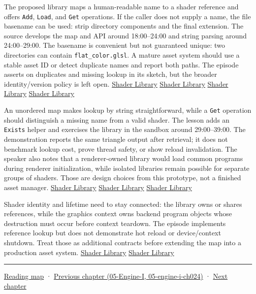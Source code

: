 The proposed library maps a human-readable name to a shader reference and offers \texttt{Add}, \texttt{Load}, and \texttt{Get} operations. If the caller does not supply a name, the file basename can be used: strip directory components and the final extension. The source develops the map and API around 18:00--24:00 and string parsing around 24:00--29:00. The basename is convenient but not guaranteed unique: two directories can contain \texttt{flat\_color.glsl}. A mature asset system should use a stable asset ID or detect duplicate names and report both paths. The episode asserts on duplicates and missing lookup in its sketch, but the broader identity/version policy is left open. \href{https://www.youtube.com/watch?v=Z9LE3ksHEQQ&t=1080s}{Shader Library} \href{https://www.youtube.com/watch?v=Z9LE3ksHEQQ&t=1320s}{Shader Library} \href{https://www.youtube.com/watch?v=Z9LE3ksHEQQ&t=1500s}{Shader Library} \href{https://www.youtube.com/watch?v=Z9LE3ksHEQQ&t=1680s}{Shader Library}

An unordered map makes lookup by string straightforward, while a \texttt{Get} operation should distinguish a missing name from a valid shader. The lesson adds an \texttt{Exists} helper and exercises the library in the sandbox around 29:00--39:00. The demonstration reports the same triangle output after retrieval; it does not benchmark lookup cost, prove thread safety, or show reload invalidation. The speaker also notes that a renderer-owned library would load common programs during renderer initialization, while isolated libraries remain possible for separate groups of shaders. Those are design choices from this prototype, not a finished asset manager. \href{https://www.youtube.com/watch?v=Z9LE3ksHEQQ&t=1740s}{Shader Library} \href{https://www.youtube.com/watch?v=Z9LE3ksHEQQ&t=2040s}{Shader Library} \href{https://www.youtube.com/watch?v=Z9LE3ksHEQQ&t=2220s}{Shader Library}

Shader identity and lifetime need to stay connected: the library owns or shares references, while the graphics context owns backend program objects whose destruction must occur before context teardown. The episode implements reference lookup but does not demonstrate hot reload or device/context shutdown. Treat those as additional contracts before extending the map into a production asset system. \href{https://www.youtube.com/watch?v=Z9LE3ksHEQQ&t=2400s}{Shader Library} \href{https://www.youtube.com/watch?v=Z9LE3ksHEQQ&t=2460s}{Shader Library}

\begin{center}\rule{0.5\linewidth}{0.5pt}\end{center}

\hyperref[volume-reading-map]{Reading map} · \href{../05-Engine-I/main.pdf\#nameddest=05-engine-i-ch024}{Previous chapter (05-Engine-I, 05-engine-i-ch024)} · \hyperref[06-engine-ii-ch026]{Next chapter}
